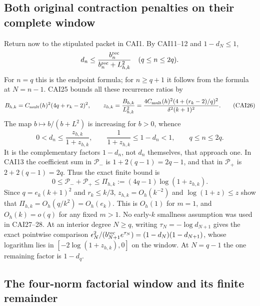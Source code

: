 \subsection{Both original contraction penalties on their complete window}

Return now to the stipulated packet in CAI1. By CAI11--12 and
$1-d_N\le1$,
\[
 d_n\le\frac{b_n^{\rm rec}}{b_n^{\rm rec}+L_{h,k}^2}
                         \quad(q\le n\le2q).
\]
For $n=q$ this is the endpoint formula; for $n\ge q+1$ it follows
from the formula at $N=n-1$. CAI25 bounds all these recurrence ratios by
\[
 B_{h,k}=C_{\rm mult}(h)^2(4q+r_k-2)^2,\qquad
 z_{h,k}=\frac{B_{h,k}}{L_{h,k}^2}
   =\frac{4C_{\rm mult}(h)^2(4+(r_k-2)/q)^2}{\delta^2(k+1)^2}.
 \tag{CAI26}
\]
The map $b\mapsto b/(b+L^2)$ is increasing for $b>0$, whence
\[
 0<d_n\le\frac{z_{h,k}}{1+z_{h,k}},\qquad
 \frac1{1+z_{h,k}}\le1-d_n<1,\qquad q\le n\le2q.\tag{CAI27}
\]
It is the complementary factors $1-d_n$, not $d_n$ themselves, that
approach one. In CAI13 the coefficient sum in $\mathcal P_-$ is
$1+2(q-1)=2q-1$, and that in $\mathcal P_+$ is $2+2(q-1)=2q$.
Thus the exact finite bound is
\[
 \boxed{0\le\mathcal P_-+\mathcal P_+
      \le\Pi_{h,k}:=(4q-1)\log(1+z_{h,k}).}\tag{CAI28}
\]
Since $q=e_k(k+1)^2$ and $r_k\le k/3$, $z_{h,k}=O_h(k^{-2})$ and
$\log(1+z)\le z$ show that $\Pi_{h,k}=O_h(q/k^2)=O_h(e_k)$.
This is $O_h(1)$ for $m=1$, and $O_h(k)=o(q)$ for any fixed $m>1$.
No early-$k$ smallness assumption was used in CAI27--28.
At an interior degree $N\ge q$, writing $\tau_N=-\log d_{N+1}$ gives
the exact pointwise comparison
$\epsilon_N^2/(b_{N+1}^{\rm rec}e^{\tau_N})=(1-d_N)(1-d_{N+1})$,
whose logarithm lies in $[-2\log(1+z_{h,k}),0]$ on the window.
At $N=q-1$ the one remaining factor is $1-d_q$.

\subsection{The four-norm factorial window and its finite remainder}

